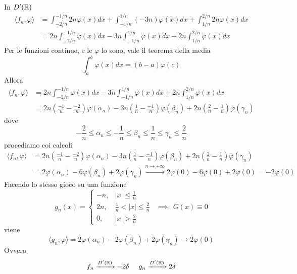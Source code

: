 In $D'(\mathbb{R})$
\begin{equation*}
\begin{aligned}
\langle f_{n}, \varphi \rangle & = \int^{- 1/n}_{- 2/n} 2n\varphi (x) dx + \int^{1/n}_{- 1/n}(- 3n) \varphi (x) dx + \int^{2/n}_{1/n} 2n\varphi (x) dx\\
 & = 2n\int^{- 1/n}_{- 2/n} \varphi (x) dx - 3n\int^{1/n}_{- 1/n} \varphi (x) dx + 2n\int^{2/n}_{1/n} \varphi (x) dx
\end{aligned}
\end{equation*}
Per le funzioni continue, e le $\varphi $ lo sono, vale il teorema della media
\begin{equation*}
\int^{b}_{a} \varphi (x) dx = (b - a) \varphi (c)
\end{equation*}
Allora
\begin{equation*}
\begin{aligned}
\langle f_{n}, \varphi \rangle & = 2n\int^{- 1/n}_{- 2/n} \varphi (x) dx - 3n\int^{1/n}_{- 1/n} \varphi (x) dx + 2n\int^{2/n}_{1/n} \varphi (x) dx\\
 & = 2n\left(\frac{- 1}{n} - \frac{- 2}{n}\right) \varphi (\alpha_{n}) - 3n\left(\frac{1}{n} - \frac{- 1}{n}\right) \varphi (\beta_{n}) + 2n\left(\frac{2}{n} - \frac{1}{n}\right) \varphi (\gamma_{n})
\end{aligned}
\end{equation*}
dove
\begin{equation*}
- \frac{2}{n} \leq \alpha_{n} \leq - \frac{1}{n} \leq \beta_{n} \leq \frac{1}{n} \leq \gamma_{n} \leq \frac{2}{n}
\end{equation*}
procediamo coi calcoli
\begin{equation*}
\begin{aligned}
\langle f_{n}, \varphi \rangle & = 2n\left(\frac{- 1}{n} - \frac{- 2}{n}\right) \varphi (\alpha_{n}) - 3n\left(\frac{1}{n} - \frac{- 1}{n}\right) \varphi (\beta_{n}) + 2n\left(\frac{2}{n} - \frac{1}{n}\right) \varphi (\gamma_{n})\\
 & = 2\varphi (\alpha_{n}) - 6\varphi (\beta_{n}) + 2\varphi (\gamma_{n})\xrightarrow{n\rightarrow + \infty} 2\varphi (0) - 6\varphi (0) + 2\varphi (0) = - 2\varphi (0)
\end{aligned}
\end{equation*}
Facendo lo stesso gioco su una funzione
\begin{equation*}
g_{n} (x) =
\begin{cases}
- n, & |x| \leq \frac{1}{n}\\
2n, & \frac{1}{n} < |x| \leq \frac{2}{n}\\
0, & |x| > \frac{2}{n}
\end{cases} \ \ \implies \ \ G(x) \equiv 0
\end{equation*}
viene
\begin{equation*}
\langle g_{n}, \varphi \rangle = 2\varphi (\alpha_{n}) - 2\varphi (\beta_{n}) + 2\varphi (\gamma_{n})\rightarrow 2\varphi (0)
\end{equation*}
Ovvero
\begin{equation*}
f_{n}\xrightarrow{D'(\mathbb{R})} - 2\delta \ \ \ \ g_{n}\xrightarrow{D'(\mathbb{R})} 2\delta
\end{equation*}

